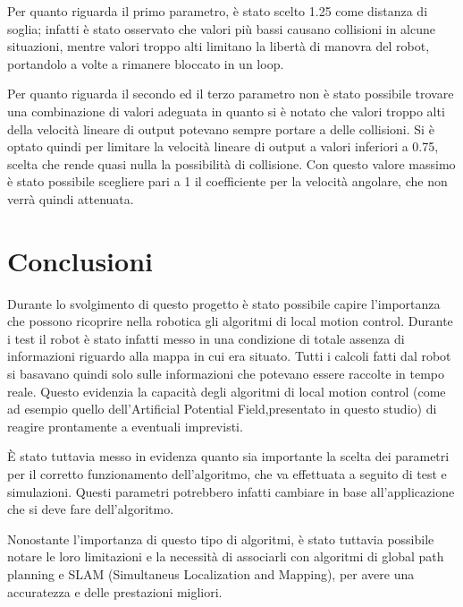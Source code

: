 \documentclass[Lau, binding=0.6cm, oneside]{sapthesis}
\begin{document}
Per quanto riguarda il primo parametro, è stato scelto 1.25 come distanza di soglia; infatti è stato osservato che valori più bassi causano collisioni in alcune situazioni, mentre valori troppo alti limitano la libertà di manovra del robot, portandolo a volte a rimanere bloccato in un loop.

Per quanto riguarda il secondo ed il terzo parametro non è stato possibile trovare una combinazione di valori adeguata in quanto si è notato che valori troppo alti della velocità lineare di output potevano sempre portare a delle collisioni.
Si è optato quindi per limitare la velocità lineare di output a valori inferiori a 0.75, scelta che rende quasi nulla la possibilità di collisione.
Con questo valore massimo è stato possibile scegliere pari a 1 il coefficiente per la velocità angolare, che non verrà quindi attenuata.

\chapter{Conclusioni}
Durante lo svolgimento di questo progetto è stato possibile capire l'importanza che possono ricoprire nella robotica gli algoritmi di local motion control.
Durante i test il robot è stato infatti messo in una condizione di totale assenza di informazioni riguardo alla mappa in cui era situato.
Tutti i calcoli fatti dal robot si basavano quindi solo sulle informazioni che potevano essere raccolte in tempo reale.
Questo evidenzia la capacità degli algoritmi di local motion control (come ad esempio quello dell'Artificial Potential Field,presentato in questo studio) di reagire prontamente a eventuali imprevisti.

È stato tuttavia messo in evidenza quanto sia importante la scelta dei parametri per il corretto funzionamento dell'algoritmo, che va effettuata a seguito di test e simulazioni.
Questi parametri potrebbero infatti cambiare in base all'applicazione che si deve fare dell'algoritmo.

Nonostante l'importanza di questo tipo di algoritmi, è stato tuttavia possibile notare le loro limitazioni e la necessità di associarli con algoritmi di global path planning e SLAM (Simultaneus Localization and Mapping), per avere una accuratezza e delle prestazioni migliori.



\end{document}
